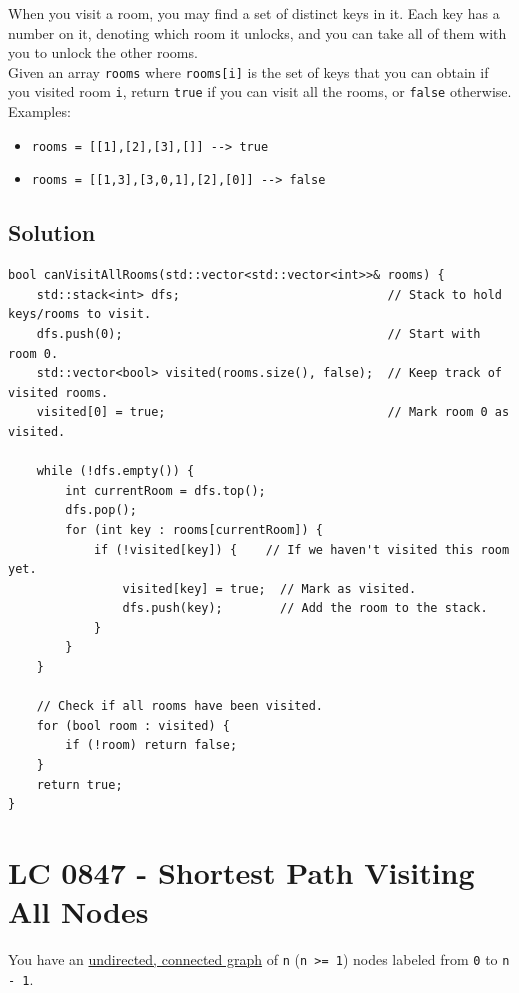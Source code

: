 When you visit a room, you may find a set of distinct keys in it. Each key has a number on it, denoting which room it unlocks, and you can take all of them with you to unlock the other rooms.\\

Given an array {\colorbox{CodeBackground}{\lstinline|rooms|}} where {\colorbox{CodeBackground}{\lstinline|rooms[i]|}} is the set of keys that you can obtain if you visited room {\colorbox{CodeBackground}{\lstinline|i|}}, return {\colorbox{CodeBackground}{\lstinline|true|}} if you can visit all the rooms, or {\colorbox{CodeBackground}{\lstinline|false|}} otherwise.\\

Examples:
\begin{itemize}
	\item {\colorbox{CodeBackground}{\lstinline|rooms = [[1],[2],[3],[]] --> true|}}
	\item {\colorbox{CodeBackground}{\lstinline|rooms = [[1,3],[3,0,1],[2],[0]] --> false|}}
\end{itemize}

\subsection*{Solution}
\begin{lstlisting}
bool canVisitAllRooms(std::vector<std::vector<int>>& rooms) {
	std::stack<int> dfs;                             // Stack to hold keys/rooms to visit.
	dfs.push(0);                                     // Start with room 0.
	std::vector<bool> visited(rooms.size(), false);  // Keep track of visited rooms.
	visited[0] = true;                               // Mark room 0 as visited.
	
	while (!dfs.empty()) {
		int currentRoom = dfs.top();
		dfs.pop();
		for (int key : rooms[currentRoom]) {
			if (!visited[key]) {    // If we haven't visited this room yet.
				visited[key] = true;  // Mark as visited.
				dfs.push(key);        // Add the room to the stack.
			}
		}
	}
	
	// Check if all rooms have been visited.
	for (bool room : visited) {
		if (!room) return false;
	}
	return true;
}
\end{lstlisting}

\section{LC 0847 - Shortest Path Visiting All Nodes}
You have an \ul{undirected, connected graph} of {\colorbox{CodeBackground}{\lstinline|n|}} ({\colorbox{CodeBackground}{\lstinline|n >= 1|}}) nodes labeled from {\colorbox{CodeBackground}{\lstinline|0|}} to {\colorbox{CodeBackground}{\lstinline|n - 1|}}. \\

